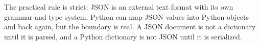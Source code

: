 The practical rule is strict: JSON is an external text format with its own grammar and type system. Python can map JSON values into Python objects and back again, but the boundary is real. A JSON document is not a dictionary until it is parsed, and a Python dictionary is not JSON until it is serialized.